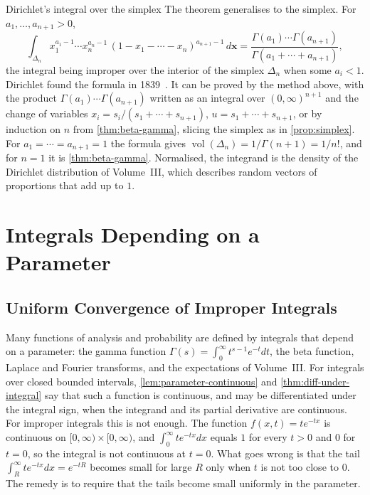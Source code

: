 \begin{note}{Dirichlet's integral over the simplex}
The theorem generalises to the simplex. For $a_1,\ldots,a_{n+1}>0$,
\[
\int_{\Delta_n}x_1^{a_1-1}\cdots x_n^{a_n-1}\,(1-x_1-\cdots-x_n)^{a_{n+1}-1}\,d\mathbf x=\frac{\Gamma(a_1)\cdots\Gamma(a_{n+1})}{\Gamma(a_1+\cdots+a_{n+1})},
\]
the integral being improper over the interior of the simplex $\Delta_n$ when some $a_i<1$. Dirichlet found the formula in 1839~\cite{dirichlet1839}. It can be proved by the method above, with the product $\Gamma(a_1)\cdots\Gamma(a_{n+1})$ written as an integral over $(0,\infty)^{n+1}$ and the change of variables $x_i=s_i/(s_1+\cdots+s_{n+1})$, $u=s_1+\cdots+s_{n+1}$, or by induction on $n$ from \cref{thm:beta-gamma}, slicing the simplex as in \cref{prop:simplex}. For $a_1=\cdots=a_{n+1}=1$ the formula gives $\operatorname{vol}(\Delta_n)=1/\Gamma(n+1)=1/n!$, and for $n=1$ it is \cref{thm:beta-gamma}. Normalised, the integrand is the density of the Dirichlet distribution of Volume~III, which describes random vectors of proportions that add up to $1$.
\end{note}

\section{Integrals Depending on a Parameter}
\label{sec:parameter-integrals}

\subsection{Uniform Convergence of Improper Integrals}

Many functions of analysis and probability are defined by integrals that depend on a parameter: the gamma function $\Gamma(s)=\int_0^\infty t^{s-1}e^{-t}dt$, the beta function, Laplace and Fourier transforms, and the expectations of Volume~III. For integrals over closed bounded intervals, \cref{lem:parameter-continuous} and \cref{thm:diff-under-integral} say that such a function is continuous, and may be differentiated under the integral sign, when the integrand and its partial derivative are continuous. For improper integrals this is not enough. The function $f(x,t)=te^{-tx}$ is continuous on $[0,\infty)\times[0,\infty)$, and $\int_0^\infty te^{-tx}dx$ equals $1$ for every $t>0$ and $0$ for $t=0$, so the integral is not continuous at $t=0$. What goes wrong is that the tail $\int_R^\infty te^{-tx}dx=e^{-tR}$ becomes small for large $R$ only when $t$ is not too close to $0$. The remedy is to require that the tails become small uniformly in the parameter.

